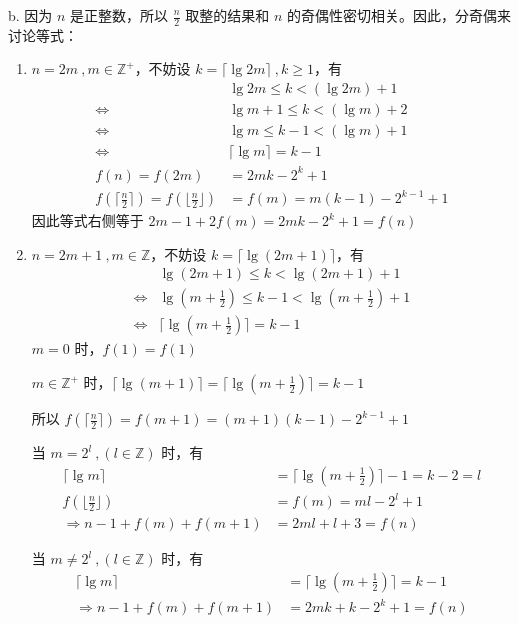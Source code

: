 b. 因为 \( n \) 是正整数，所以 \( \frac{n}{2} \) 取整的结果和 \( n \) 的奇偶性密切相关。因此，分奇偶来讨论等式：
\begin{enumerate}
  \item \( n = 2m \ , m \in \mathbb{Z^+} \)，不妨设 \( k = \lceil \lg{2m} \rceil \ , k \ge 1 \)，有
    \begin{align*}
      \phantom{\Leftrightarrow} & \lg{2m} \le k < (\lg{2m}) + 1 \\
      \Leftrightarrow & \lg{m} + 1 \le k < (\lg{m}) + 2 \\
      \Leftrightarrow & \lg{m} \le k-1 < (\lg{m}) + 1 \\
      \Leftrightarrow & \lceil \lg{m} \rceil = k-1 \\
      f(n) = f(2m) & = 2m k - 2^k + 1 \\
      f(\lceil \frac{n}{2} \rceil) = f(\lfloor \frac{n}{2} \rfloor) & = f(m) = m (k-1) - 2^{k-1} + 1
    \end{align*}
    因此等式右侧等于 \( 2m - 1 + 2 f(m) = 2mk - 2^k + 1 = f(n) \)
  \item \( n = 2m + 1 \ , m \in \mathbb{Z} \)，不妨设 \( k = \lceil \lg{(2m + 1)} \rceil \)，有
    \begin{align*}
      \phantom{\Leftrightarrow} & \lg{(2m+1)} \le k < \lg{(2m+1)} + 1 \\
      \Leftrightarrow & \lg{(m + \frac{1}{2})} \le k - 1 < \lg{(m + \frac{1}{2})} + 1 \\
      \Leftrightarrow & \lceil \lg{(m + \frac{1}{2})} \rceil = k-1
    \end{align*}
    \( m = 0 \) 时，\( f(1) = f(1) \)

    \( m \in \mathbb{Z^+} \) 时，\( \lceil\lg{(m + 1)} \rceil = \lceil \lg{(m + \frac{1}{2})} \rceil = k - 1 \)

    所以 \( f(\lceil \frac{n}{2} \rceil) = f(m+1) = (m+1) (k-1) - 2^{k-1} + 1 \)

    当 \( m = 2^l \ , (l \in \mathbb{Z}) \) 时，有
    \begin{align*}
      \lceil \lg{m} \rceil &= \lceil \lg{(m + \frac{1}{2})} \rceil - 1 = k - 2 = l \\
      f(\lfloor \frac{n}{2} \rfloor) & = f(m) = ml - 2^l + 1 \\
      \Rightarrow n - 1 + f(m) + f(m+1) & = 2ml + l + 3 = f(n)
    \end{align*}

    当 \( m \neq 2^l \ , (l \in \mathbb{Z}) \) 时，有
    \begin{align*}
      \lceil \lg{m} \rceil &= \lceil \lg{(m + \frac{1}{2})} \rceil = k -1 \\
      \Rightarrow n - 1 + f(m) + f(m+1) & = 2mk + k - 2^k + 1 = f(n)
    \end{align*}
\end{enumerate}

